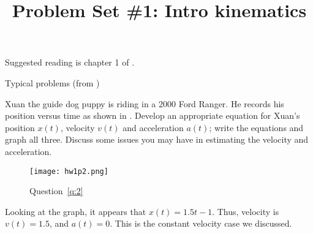 \documentclass [hw,noanswers]{exam}
\title{Problem Set \#1: Intro kinematics}
\author{\mobeardInstructorShort}
\date{\printdate{6/15/2021}}
\begin{document}
\maketitle

Suggested reading is chapter 1 of \citet{kleppner2014introduction}.

\begin{questions}
\question Typical problems (from \citet{hecht2018schaums})

\question\label{q:2} Xuan the guide dog puppy is riding in a 2000 Ford Ranger. He records his position versus time as shown in . Develop an appropriate equation for Xuan's position $x(t)$, velocity $v(t)$ and acceleration $a(t)$; write the equations and graph all three. Discuss some issues you may have in estimating the velocity and acceleration. 
\begin{figure}[h]
\begin{center}
\texttt{[image: hw1p2.png]}
\end{center}
\caption{Question~\ref{q:2}}
\label{fig:q2}
\end{figure}
\begin{solution}
Looking at the graph, it appears that $x(t)=1.5t-1$. Thus, velocity is $v(t)=1.5$, and $a(t)=0$. This is the constant velocity case we discussed. 


\end{solution}
\end{questions}
\end{document}

